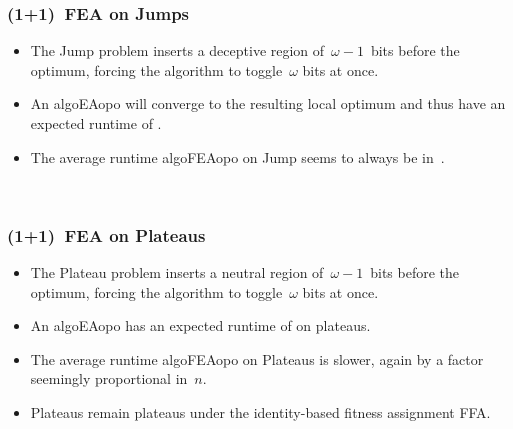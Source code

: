 \documentclass[aspectratio=169,mathserif,notheorems]{beamer}%
\begin{document}
%
\begin{frame}%
\frametitle{(1+1)~FEA on Jumps}%
\parbox{0.37\paperwidth}{%
\begin{itemize}%
\item The Jump problem inserts a deceptive region of~$\omega-1$~bits before the optimum, forcing the algorithm to toggle~$\omega$ bits at once\cite{DJW2002OTAOTOPOEA,FQW2018ELDBOAWHTMO}.%
\item<2-> An \gls{algoEAopo} will converge to the resulting local optimum and thus have an expected runtime of .\cite{DJW2002OTAOTOPOEA}%
\item<3-> The average runtime \gls{algoFEAopo} on Jump seems to \alert{always} be in~.%
\end{itemize}%
}\\%
%
%
%
%
%
\end{frame}%
%
\begin{frame}%
\frametitle{(1+1)~FEA on Plateaus}%
\parbox{0.37\paperwidth}{%
\begin{itemize}%
\item The Plateau problem inserts a neutral region of~$\omega-1$~bits before the optimum, forcing the algorithm to toggle~$\omega$ bits at once\cite{AD2018PRAFP}.%
\item<2-> An \gls{algoEAopo} has an expected runtime of  on plateaus\cite{AD2018PRAFP}.%
\item<3-> The average runtime \gls{algoFEAopo} on Plateaus is slower, again by a factor seemingly proportional in~$n$.%
\item<4-> Plateaus remain plateaus under the identity-based fitness assignment FFA.%
\end{itemize}%
}%
%
%
%
%
\end{frame}%
\end{document}
